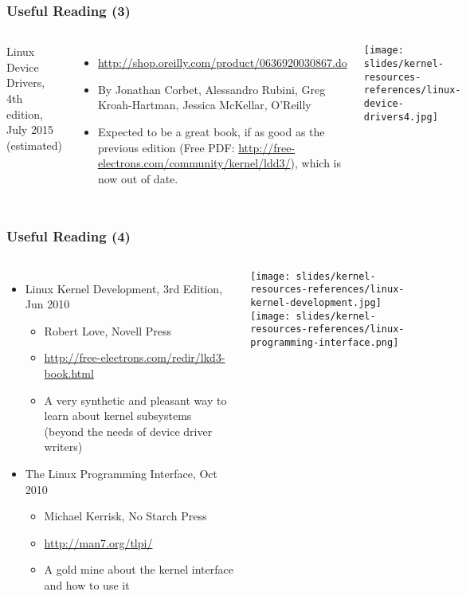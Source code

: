 \begin{frame}
  \frametitle{Useful Reading (3)}
  \begin{columns}
    Linux Device Drivers, 4th edition, July 2015 (estimated)
    \begin{itemize}
    \item \url{http://shop.oreilly.com/product/0636920030867.do}
    \item By Jonathan Corbet, Alessandro Rubini, Greg Kroah-Hartman,
      Jessica McKellar, O'Reilly
    \item Expected to be a great book, if as good as the previous
      edition (Free PDF: \url{http://free-electrons.com/community/kernel/ldd3/}),
      which is now out of date.
    \end{itemize}
    \texttt{[image: slides/kernel-resources-references/linux-device-drivers4.jpg]}
  \end{columns}
\end{frame}

\begin{frame}
  \frametitle{Useful Reading (4)}
  \begin{columns}
    \begin{itemize}
    \item Linux Kernel Development, 3rd Edition, Jun 2010
      \begin{itemize}
      \item Robert Love, Novell Press
      \item \url{http://free-electrons.com/redir/lkd3-book.html}
      \item A very synthetic and pleasant way to learn about kernel
        subsystems (beyond the needs of device driver writers)
      \end{itemize}
    \item The Linux Programming Interface, Oct 2010
      \begin{itemize}
      \item Michael Kerrisk, No Starch Press
      \item \url{http://man7.org/tlpi/}
      \item A gold mine about the kernel interface and how to use it
      \end{itemize}
    \end{itemize}
    \begin{center}
      \texttt{[image: slides/kernel-resources-references/linux-kernel-development.jpg]}\\
      \texttt{[image: slides/kernel-resources-references/linux-programming-interface.png]}
    \end{center}
  \end{columns}
\end{frame}

